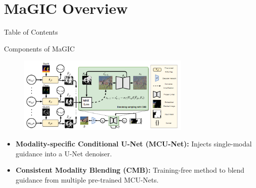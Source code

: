 \documentclass[pdf]{beamer}
\begin{document}
\section{MaGIC Overview}
\begin{frame}{Table of Contents}
    \tableofcontents[currentsection]
\end{frame}

\begin{frame}{Components of MaGIC}
    \begin{figure}
        \centering
        \includegraphics[width=0.75\textwidth]{figures/inference_process.png}
    \end{figure}
    \begin{itemize}
        \item \textbf{Modality-specific Conditional U-Net (MCU-Net):} Injects single-modal guidance into a U-Net denoiser.
        \item \textbf{Consistent Modality Blending (CMB):} Training-free method to blend guidance from multiple pre-trained MCU-Nets.
    \end{itemize}
\end{frame}
\end{document}

